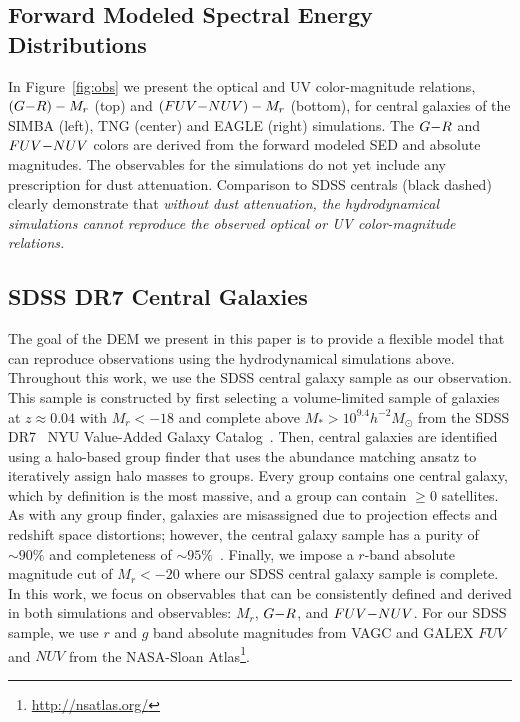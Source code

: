 \subsection{Forward Modeled Spectral Energy Distributions} \label{sec:fm} 

In Figure~\ref{fig:obs} we present the optical and UV color-magnitude
relations, $(G{-}R)-M_r$ (top) and $(FUV{-}NUV)-M_r$ (bottom), for central galaxies
of the SIMBA (left), TNG (center) and EAGLE (right) simulations. The $G{-}R$ and
$FUV{-}NUV$ colors are derived from the forward modeled SED and absolute magnitudes.
The observables for the simulations do not yet include any prescription for dust
attenuation. Comparison to SDSS centrals (black dashed) clearly demonstrate
that {\em without dust attenuation, the hydrodynamical simulations cannot
reproduce the observed optical or UV color-magnitude relations.}

\subsection{SDSS DR7 Central Galaxies} \label{sec:obs} 
The goal of the DEM we present in this paper is to provide a flexible model
that can reproduce observations using the hydrodynamical simulations above. 
Throughout this work, we use the \cite{tinker2011} SDSS central galaxy sample 
as our observation. This sample is constructed by first selecting a
volume-limited sample of galaxies at $z \approx 0.04$ with $M_r < -18$ and
complete above $M_* > 10^{9.4} h^{-2}M_\odot$ from the SDSS
DR7~\citep{abazajian2009} NYU Value-Added Galaxy Catalog~\citep[VAGC;][]{blanton2005}. 
Then, central galaxies are identified using a halo-based group finder that
uses the abundance matching ansatz to iteratively assign halo masses to groups.
Every group contains one central galaxy, which by definition is the most
massive, and a group can contain $\ge0$ satellites.  As with any group finder,
galaxies are misassigned due to projection effects and redshift space
distortions; however, the central galaxy sample has a purity of ${\sim}90\%$
and completeness of ${\sim}95\%$~\citep{tinker2018}. Finally, we impose a
$r$-band absolute magnitude cut of $M_r < -20$ where our SDSS central galaxy 
sample is complete. In this work, we focus on observables that can be 
consistently defined and derived in both simulations and observables: 
$M_r$, $G{-}R$, and $FUV{-}NUV$. For our SDSS sample, we use $r$ and $g$ band 
absolute magnitudes from VAGC and GALEX $FUV$ and $NUV$ from the
NASA-Sloan Atlas\footnote{\url{http://nsatlas.org/}}. 

